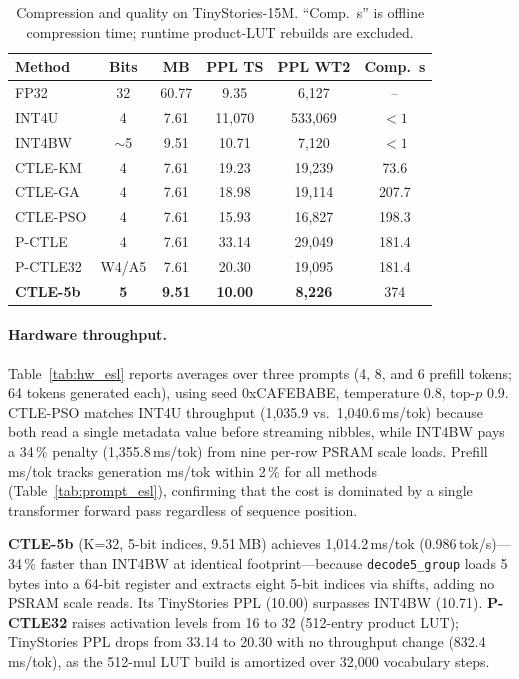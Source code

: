 \documentclass[10pt,journal]{IEEEtran}
\begin{document}
\begin{table}[t]
\centering
\footnotesize
\caption{Compression and quality on TinyStories-15M. ``Comp.\ s'' is offline
compression time; runtime product-LUT rebuilds are excluded.}
\label{tab:quality}
\setlength{\tabcolsep}{3pt}
\renewcommand{\arraystretch}{1.12}
\begin{tabular}{lccccc}
\hline
Method & Bits & MB & PPL TS & PPL WT2 & Comp.\ s \\
\hline
FP32 & 32 & 60.77 & \phantom{0,0}9.35 & \phantom{0}6{,}127 & -- \\
INT4U & 4 & 7.61 & 11{,}070 & 533{,}069 & ${<}1$ \\
INT4BW & $\sim$5 & 9.51 & \phantom{0,}10.71 & \phantom{0}7{,}120 & ${<}1$ \\
CTLE-KM & 4 & 7.61 & \phantom{0,}19.23 & 19{,}239 & 73.6 \\
CTLE-GA & 4 & 7.61 & \phantom{0,}18.98 & 19{,}114 & 207.7 \\
CTLE-PSO & 4 & 7.61 & \phantom{0,}15.93 & 16{,}827 & 198.3 \\
P-CTLE & 4 & 7.61 & \phantom{0,}33.14 & 29{,}049 & 181.4 \\
P-CTLE32 & W4/A5 & 7.61 & \phantom{0,}20.30 & 19{,}095 & 181.4 \\
\textbf{CTLE-5b} & \textbf{5} & \textbf{9.51} & \phantom{0,}\textbf{10.00} & \phantom{0}\textbf{8{,}226} & 374 \\
\hline
\end{tabular}
\end{table}

\paragraph{Hardware throughput.}
Table~\ref{tab:hw_esl} reports averages over three prompts (4, 8, and 6 prefill
tokens; 64 tokens generated each), using seed 0xCAFEBABE, temperature 0.8,
top-$p$ 0.9. CTLE-PSO matches INT4U throughput (1{,}035.9 vs.\ 1{,}040.6\,ms/tok)
because both read a single metadata value before streaming nibbles, while
INT4BW pays a 34\,\% penalty (1{,}355.8\,ms/tok) from nine per-row PSRAM scale
loads. Prefill ms/tok tracks generation ms/tok within 2\,\% for all methods
(Table~\ref{tab:prompt_esl}), confirming that the cost is dominated by a single
transformer forward pass regardless of sequence position.

\textbf{CTLE-5b} (K=32, 5-bit indices, 9.51\,MB) achieves 1{,}014.2\,ms/tok
(0.986\,tok/s)---34\,\% faster than INT4BW at identical footprint---because
\texttt{decode5\_group} loads 5 bytes into a 64-bit register and extracts eight
5-bit indices via shifts, adding no PSRAM scale reads. Its TinyStories PPL
(10.00) surpasses INT4BW (10.71). \textbf{P-CTLE32} raises activation levels
from 16 to 32 (512-entry product LUT); TinyStories PPL drops from 33.14 to
20.30 with no throughput change (832.4\,ms/tok), as the 512-mul LUT build is
amortized over 32{,}000 vocabulary steps.
\end{document}
